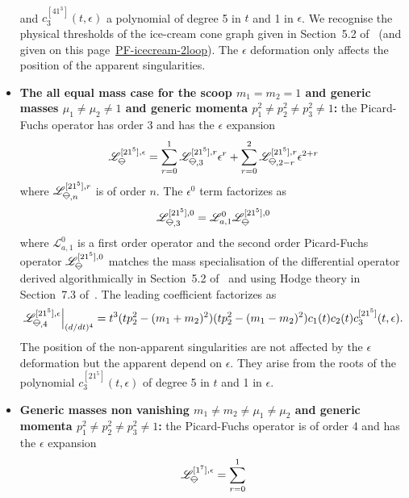 \documentclass[a4paper,12pt]{article}
\numberwithin{equation}{section}
\numberwithin{figure}{section}
\newcommand{\IceCream}{	\begin{tikzpicture}[scale=0.05]
	\draw[color = black, fill=none] (2,0) arc(0:180:2);
		\draw [black] (-2,0) to (2,0);
		\draw [black] (-2,0) to (0,-2);
                	\draw [black] (2,0) to (0,-2);
	\end{tikzpicture}}
\begin{document}
\begin{itemize}
\begin{multline}
	\end{multline}
	and $c^{[41^3]}_3(t,\epsilon)$ a polynomial of  degree 5 in $t$ and 1 in
	$\epsilon$. We recognise the physical thresholds of the ice-cream
	cone graph given in Section~5.2 of~\cite{Lairez:2022zkj} (and given
	on this
	page~\href{https://nbviewer.org/github/pierrevanhove/PicardFuchs/blob/main/PF-icecream-2loop.ipynb}{PF-icecream-2loop}). The
	$\epsilon$ deformation only affects the position of the apparent singularities. 
	\item \textbf{The all equal mass case for the scoop
		$m_1=m_2=1$ and generic masses $\mu_1\neq\mu_2\neq1$ and generic
		momenta  $p_1^2\neq p_2^2\neq
		p_3^2\neq 1$:}  the Picard-Fuchs operator has order 3 and has the
	$\epsilon$ expansion
	\begin{equation}
		\mathscr{L}_{\IceCream}^{[21^5],\epsilon}=\sum_{r=0}^1
		\mathscr{L}_{\IceCream,3}^{[21^5],r} \epsilon^r+ \sum_{r=0}^2   \mathscr{L}_{\IceCream,2-r}^{[21^5],r} \epsilon^{2+r}
	\end{equation}
	where $ \mathscr{L}_{\IceCream,n}^{[21^5],r}$  is of order $n$. The
	$\epsilon^0$ term factorizes as
	\begin{equation}
		\mathscr{L}_{\IceCream,3}^{[21^5],0}=\mathscr{L}_{a,1}^0 \mathscr{L}_{\IceCream}^{[21^5] ,0      }
	\end{equation}
	where $\mathscr{L}_{a,1}^0$ is a first order operator and the second order
	Picard-Fuchs operator  $\mathscr{L}_{\IceCream}^{[21^5] ,0}
	$ matches the mass specialisation of the differential
	operator derived algorithmically in Section~5.2
	of~\cite{Lairez:2022zkj} and using Hodge theory in
	Section~7.3 of~\cite{Doran:2023yzu}.
	The leading coefficient factorizes as
	\begin{equation}
		\mathscr{L}_{\IceCream,4}^{[21^5],\epsilon}\Big|_{(d/dt)^4}=t^3
		(tp_2^2-(m_1+m_2)^2)(tp_2^2-(m_1-m_2)^2) c_1(t)
		c_2(t) c^{[21^5]}_3(t,\epsilon)   .
	\end{equation}
	The position of the non-apparent singularities are
	not affected by the $\epsilon$ deformation but the
	apparent depend on $\epsilon$. They arise from the
	roots of the polynomial $c^{[21^5]}_3(t,\epsilon)   $ of
	degree 5 in $t$ and 1 in $\epsilon$.
	\item \textbf{Generic masses non vanishing
		$m_1\neq m_2\neq\mu_1\neq\mu_2$ and generic
		momenta  $p_1^2\neq p_2^2\neq
		p_3^2\neq 1$:}  the Picard-Fuchs operator is of order 4 and has the
	$\epsilon$ expansion
	\begin{equation}
		\mathscr{L}_{\IceCream}^{[1^7],\epsilon}=\sum_{r=0}^1

\end{equation}
\end{itemize}
\end{document}
